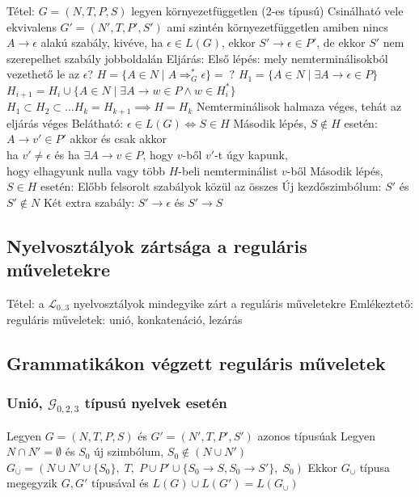 \documentclass[12pt,a4paper]{article}
\newcommand{\gtos}{\Rightarrow_G^*}
\begin{document}
\begin{outline}
	\1 Tétel:
		\2 $G=(N,T,P,S)$ legyen környezetfüggetlen (2-es típusú)
		\2 Csinálható vele ekvivalens $G'=(N',T,P',S')$
			\3 ami szintén környezetfüggetlen
			\3 amiben nincs $A \to \epsilon$ alakú szabály, kivéve, ha $\epsilon \in L(G)$, ekkor $S' \to \epsilon \in P'$, de ekkor $S'$ nem szerepelhet szabály jobboldalán
	\1 Eljárás:
		\2 Első lépés: mely nemterminálisokból vezethető le az $\epsilon$?
			\3 $H = \{A \in N \;|\; A \gtos \epsilon \} = \;?$
			\3 $H_1 = \{A \in N \;|\; \exists A \to \epsilon \in P\}$
			\3 $H_{i+1} = H_i \cup \{A \in N \;|\; \exists A \to w \in P \wedge w \in H_i^*\}$
			\3 $H_1 \subset H_2 \subset ... H_k = H_{k+1} \implies H=H_k$
			\3 Nemterminálisok halmaza véges, tehát az eljárás véges
			\3 Belátható: $\epsilon \in L(G) \Leftrightarrow S \in H$
		\2 Második lépés, $S \notin H$ esetén: $A \to v' \in P'$ akkor és csak akkor\\
		ha $v' \ne \epsilon$ és ha $\exists A \to v \in P$, hogy $v$-ből $v'$-t úgy kapunk,\\
		hogy elhagyunk nulla vagy több $H$-beli nemterminálist $v$-ből
		\2 Második lépés, $S \in H$ esetén:
			\3 Előbb felsorolt szabályok közül az összes
			\3 Új kezdőszimbólum: $S'$ és $S' \notin N$
			\3 Két extra szabály: $S' \to \epsilon$ és $S' \to S$
\end{outline}

\pagebreak

\subsection{Nyelvosztályok zártsága a reguláris műveletekre}

\begin{outline}
	\1 Tétel: a $\mathcal{L}_{0..3}$ nyelvosztályok mindegyike zárt a reguláris műveletekre
	\1 Emlékeztető: reguláris műveletek: unió, konkatenáció, lezárás
\end{outline}

\subsection{Grammatikákon végzett reguláris műveletek}

\subsubsection{Unió, $\mathcal{G}_{0,2,3}$ típusú nyelvek esetén}

\begin{outline}
	\1 Legyen $G=(N,T,P,S)$ és $G'=(N',T,P',S')$ azonos típusúak
	\1 Legyen $N \cap N' = \emptyset$ és $S_0$ új szimbólum, $S_0 \notin (N \cup N')$
	\1 $G_\cup = (N \cup N' \cup \{S_0\} ,\; T ,\; P \cup P' \cup \{S_0 \to S, S_0 \to S'\} ,\; S_0)$
	\1 Ekkor $G_\cup$ típusa megegyzik $G,G'$ típusával és $L(G) \cup L(G') = L(G_\cup)$
\end{outline}
\end{document}

